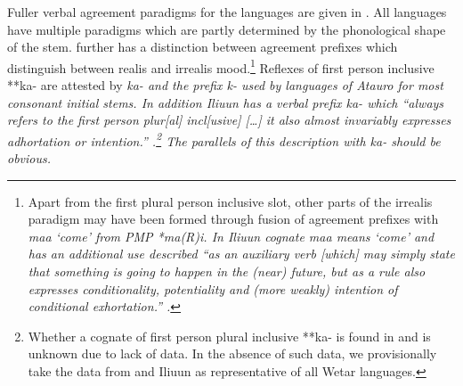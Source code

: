 Fuller verbal agreement paradigms for the 
languages are given in .
All languages have multiple paradigms which are partly determined
by the phonological shape of the stem.
 further has a distinction between agreement prefixes which
distinguish between realis and irrealis mood.\footnote{
Apart from the first plural person
inclusive slot, other parts of the  irrealis paradigm may have been formed
through fusion of agreement prefixes with \it{maa} ‘come’ from PMP *ma(R)i.
In Ili{\Q}uun cognate \it{maa} means ‘come’
and has an additional use described “as an auxiliary verb [which]
may simply state that something is going to happen in the (near)
future, but as a rule also expresses conditionality,
potentiality and (more weakly) intention of conditional exhortation.”
\citep[99]{DeJosselinDeJong1947}.}
Reflexes of 
first person inclusive **ka- are attested by  
\it{ka-} and the  prefix \it{k-} used by languages of Atauro
for most consonant initial stems.
In addition Ili{\Q}uun has a verbal prefix \it{ka-} which “always
refers to the first person plur[al] incl[usive] [{\ldots}] it
also almost invariably expresses adhortation or intention.”
\citep[98]{DeJosselinDeJong1947}.\footnote{
		Whether a cognate of first
		person plural inclusive **ka- is found in 
		and  is unknown due to lack of data.
		In the absence of such data,
		we provisionally take the data from 
		and Ili{\Q}uun as representative of all Wetar languages.}
The parallels of this description with   \it{ka-} should be obvious.

